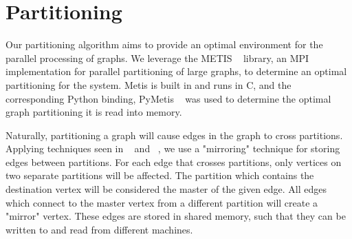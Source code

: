 \section{Partitioning}
\label{sec:partition}

Our partitioning algorithm aims to provide an optimal environment
for the parallel processing of graphs. We leverage the METIS
~\cite{Lasalle:2013:metis} library, an MPI implementation for parallel
partitioning of large graphs, to determine an optimal partitioning for the system.
Metis is built in and runs in C, and the corresponding Python binding, PyMetis ~\cite{pymetis}
was used to determine the optimal graph partitioning it is read into memory.



Naturally, partitioning a graph will cause edges in the graph to cross 
partitions. Applying techniques seen in ~\cite{Tian:2013:thinklikeagraph} and 
~\cite{Chen:2015:powerlyra}, we use a "mirroring" technique for storing edges
between partitions. For each edge that crosses partitions, only vertices on 
two separate partitions will be affected. The partition which contains the 
destination vertex will be considered the master of the given edge. All edges 
which connect to the master vertex from a different partition will create a
"mirror" vertex. These edges are stored in shared memory, such that they can
be written to and read from different machines.

